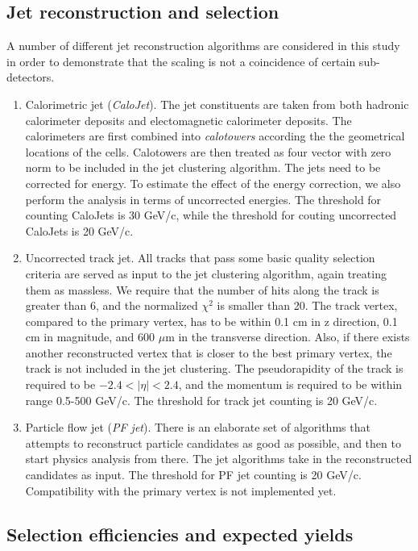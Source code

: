\documentclass{cmspaper}
\begin{document}
\subsection{Jet reconstruction and selection}

A number of different jet reconstruction algorithms are considered in
this study in order to demonstrate that the scaling is not a
coincidence of certain sub-detectors.

\begin{enumerate}
\item Calorimetric jet (\emph{CaloJet}).  The jet constituents are
  taken from both hadronic calorimeter deposits and electomagnetic
  calorimeter deposits.  The calorimeters are first combined into
  \emph{calotowers} according the the geometrical locations of the
  cells.  Calotowers are then treated as four vector with zero norm to
  be included in the jet clustering algorithm.  The jets need to be
  corrected for energy.  To estimate the effect of the energy
  correction, we also perform the analysis in terms of uncorrected
  energies.  The threshold for counting CaloJets is 30 GeV/c, while
  the threshold for couting uncorrected CaloJets is 20 GeV/c.
\item Uncorrected track jet.  All tracks that pass some basic quality
  selection criteria are served as input to the jet clustering
  algorithm, again treating them as massless.  We require that the
  number of hits along the track is greater than 6, and the normalized
  $\chi^2$ is smaller than 20.  The track vertex, compared to the
  primary vertex, has to be within 0.1 cm in z direction, 0.1 cm in
  magnitude, and 600 $\mu$m in the transverse direction.  Also, if
  there exists another reconstructed vertex that is closer to the best
  primary vertex, the track is not included in the jet clustering.
  The pseudorapidity of the track is required to be $-2.4 < |\eta| <
  2.4$, and the momentum is required to be within range 0.5-500 GeV/c.
  The threshold for track jet counting is 20 GeV/c.
\item Particle flow jet (\emph{PF jet}).  There is an elaborate set of
  algorithms that attempts to reconstruct particle candidates as good
  as possible, and then to start physics analysis from there.  The jet
  algorithms take in the reconstructed candidates as input.  The
  threshold for PF jet counting is 20 GeV/c.  Compatibility with the
  primary vertex is not implemented yet.
\end{enumerate}

\subsection{Selection efficiencies and expected yields}
\end{document}
